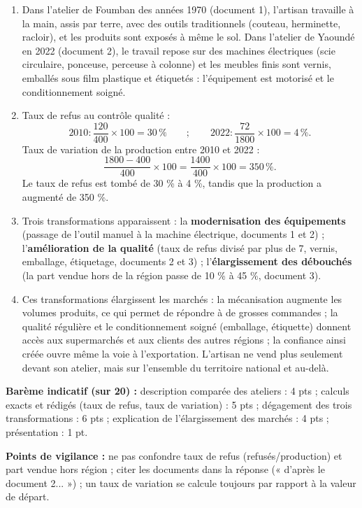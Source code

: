 \documentclass[11pt]{article}
\begin{document}
\begin{corrige}
\begin{enumerate}
\item Dans l'atelier de Foumban des années 1970 (document 1), l'artisan travaille à la main, assis par terre, avec des outils traditionnels (couteau, herminette, racloir), et les produits sont exposés à même le sol. Dans l'atelier de Yaoundé en 2022 (document 2), le travail repose sur des machines électriques (scie circulaire, ponceuse, perceuse à colonne) et les meubles finis sont vernis, emballés sous film plastique et étiquetés : l'équipement est motorisé et le conditionnement soigné.

\item Taux de refus au contrôle qualité :
\[
2010 : \frac{120}{400} \times 100 = 30\,\% \qquad ; \qquad 2022 : \frac{72}{\num{1800}} \times 100 = 4\,\%.
\]
Taux de variation de la production entre 2010 et 2022 :
\[
\frac{\num{1800} - 400}{400} \times 100 = \frac{\num{1400}}{400} \times 100 = 350\,\%.
\]
Le taux de refus est tombé de 30 \% à 4 \%, tandis que la production a augmenté de 350 \%.

\item Trois transformations apparaissent : la \textbf{modernisation des équipements} (passage de l'outil manuel à la machine électrique, documents 1 et 2) ; l'\textbf{amélioration de la qualité} (taux de refus divisé par plus de 7, vernis, emballage, étiquetage, documents 2 et 3) ; l'\textbf{élargissement des débouchés} (la part vendue hors de la région passe de 10 \% à 45 \%, document 3).

\item Ces transformations élargissent les marchés : la mécanisation augmente les volumes produits, ce qui permet de répondre à de grosses commandes ; la qualité régulière et le conditionnement soigné (emballage, étiquette) donnent accès aux supermarchés et aux clients des autres régions ; la confiance ainsi créée ouvre même la voie à l'exportation. L'artisan ne vend plus seulement devant son atelier, mais sur l'ensemble du territoire national et au-delà.
\end{enumerate}

\textbf{Barème indicatif (sur 20) :} description comparée des ateliers : 4 pts ; calculs exacts et rédigés (taux de refus, taux de variation) : 5 pts ; dégagement des trois transformations : 6 pts ; explication de l'élargissement des marchés : 4 pts ; présentation : 1 pt.

\textbf{Points de vigilance :} ne pas confondre taux de refus (refusés/production) et part vendue hors région ; citer les documents dans la réponse (« d'après le document 2... ») ; un taux de variation se calcule toujours par rapport à la valeur de départ.
\end{corrige}
\end{document}
